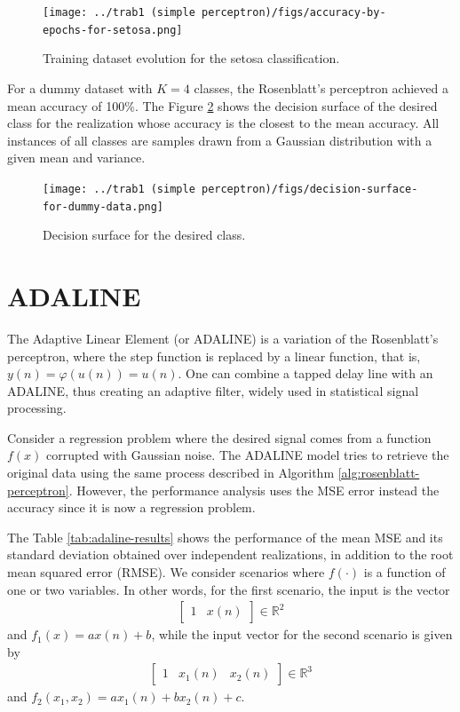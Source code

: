 \documentclass[12pt,a4paper]{article}
\newcommand{\Real}{\mathbb{R}}
\begin{document}
\begin{figure}[H]
    \centering
    \texttt{[image: ../trab1 (simple perceptron)/figs/accuracy-by-epochs-for-setosa.png]}
    \caption{Training dataset evolution for the setosa classification.}
    \label{fig:setosa-training-evolution}
\end{figure}

For a dummy dataset with \(K=4\) classes, the Rosenblatt's perceptron achieved a mean accuracy of 100\%. The Figure \ref{fig:decision-surface-dummy-data} shows the decision surface of the desired class for the realization whose accuracy is the closest to the mean accuracy. All instances of all classes are samples drawn from a Gaussian distribution with a given mean and variance.

\begin{figure}[H]
    \centering
    \texttt{[image: ../trab1 (simple perceptron)/figs/decision-surface-for-dummy-data.png]}
    \caption{Decision surface for the desired class.}
    \label{fig:decision-surface-dummy-data}
\end{figure}

\section{ADALINE}

The Adaptive Linear Element (or ADALINE) is a variation of the Rosenblatt's perceptron, where the step function is replaced by a linear function, that is, \(y(n) = \varphi(u(n)) = u(n)\). One can combine a tapped delay line with an ADALINE, thus creating an adaptive filter, widely used in statistical signal processing.

Consider a regression problem where the desired signal comes from a function \(f(x)\) corrupted with Gaussian noise. The ADALINE model tries to retrieve the original data using the same process described in Algorithm \ref{alg:rosenblatt-perceptron}. However, the performance analysis uses the MSE error instead the accuracy since it is now a regression problem.

The Table \ref{tab:adaline-results} shows the performance of the mean MSE and its standard deviation obtained over independent realizations, in addition to the root mean squared error (RMSE). We consider scenarios where \(f(\cdot)\) is a function of one or two variables. In other words, for the first scenario, the input is the vector
\begin{align}
    \begin{bmatrix}
        1 & x(n)
    \end{bmatrix} \in \Real^2
\end{align}
and \(f_1(x) = ax(n)+b\), while the input vector for the second scenario is given by
\begin{align}
    \begin{bmatrix}
        1 & x_1(n) & x_2(n)
    \end{bmatrix} \in \Real^3
\end{align}
and \(f_2(x_1, x_2) = ax_1(n)+bx_2(n)+c\).
\end{document}
